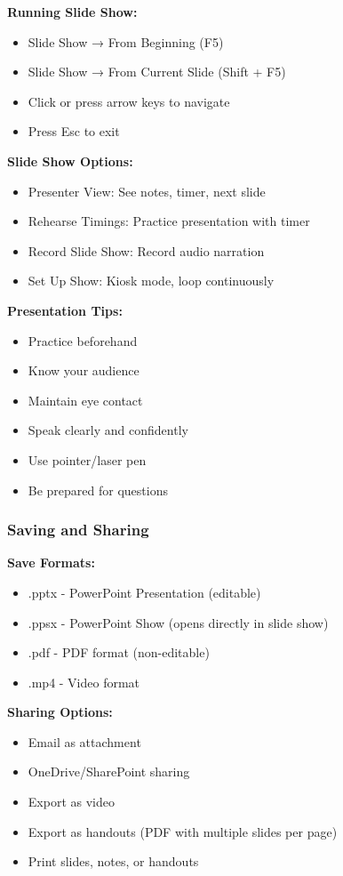 \documentclass[12pt,a4paper]{article}
\begin{document}
\textbf{Running Slide Show:}
\begin{itemize}
    \item Slide Show → From Beginning (F5)
    \item Slide Show → From Current Slide (Shift + F5)
    \item Click or press arrow keys to navigate
    \item Press Esc to exit
\end{itemize}

\textbf{Slide Show Options:}
\begin{itemize}
    \item Presenter View: See notes, timer, next slide
    \item Rehearse Timings: Practice presentation with timer
    \item Record Slide Show: Record audio narration
    \item Set Up Show: Kiosk mode, loop continuously
\end{itemize}

\textbf{Presentation Tips:}
\begin{itemize}
    \item Practice beforehand
    \item Know your audience
    \item Maintain eye contact
    \item Speak clearly and confidently
    \item Use pointer/laser pen
    \item Be prepared for questions
\end{itemize}

\subsubsection{Saving and Sharing}

\textbf{Save Formats:}
\begin{itemize}
    \item .pptx - PowerPoint Presentation (editable)
    \item .ppsx - PowerPoint Show (opens directly in slide show)
    \item .pdf - PDF format (non-editable)
    \item .mp4 - Video format
\end{itemize}

\textbf{Sharing Options:}
\begin{itemize}
    \item Email as attachment
    \item OneDrive/SharePoint sharing
    \item Export as video
    \item Export as handouts (PDF with multiple slides per page)
    \item Print slides, notes, or handouts
\end{itemize}
\end{document}
